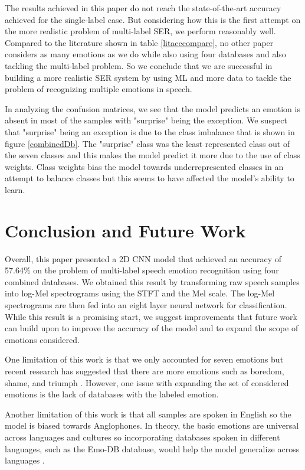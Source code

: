 The results achieved in this paper do not reach the state-of-the-art accuracy achieved for the single-label case. But considering how this is the first attempt on the more realistic problem of multi-label SER, we perform reasonably well. Compared to the literature shown in table \ref{litacccompare}, no other paper considers as many emotions as we do while also using four databases and also tackling the multi-label problem. So we conclude that we are successful in building a more realistic SER system by using ML and more data to tackle the problem of recognizing multiple emotions in speech.

In analyzing the confusion matrices, we see that the model predicts an emotion is absent in most of the samples with "surprise" being the exception. We suspect that "surprise" being an exception is due to the class imbalance that is shown in figure \ref{combinedDb}. The "surprise" class was the least represented class out of the seven classes and this makes the model predict it more due to the use of class weights. Class weights bias the model towards underrepresented classes in an attempt to balance classes but this seems to have affected the model's ability to learn.

\section{Conclusion and Future Work}

Overall, this paper presented a 2D CNN model that achieved an accuracy of 57.64\% on the problem of multi-label speech emotion recognition using four combined databases. We obtained this result by transforming raw speech samples into log-Mel spectrograms using the STFT and the Mel scale. The log-Mel spectrograms are then fed into an eight layer neural network for classification. While this result is a promising start, we suggest improvements that future work can build upon to improve the accuracy of the model and to expand the scope of emotions considered.

One limitation of this work is that we only accounted for seven emotions but recent research has suggested that there are more emotions such as boredom, shame, and triumph \cite{Cordaro2018}. However, one issue with expanding the set of considered emotions is the lack of databases with the labeled emotion.

Another limitation of this work is that all samples are spoken in English so the model is biased towards Anglophones. In theory, the basic emotions are universal across languages and cultures so incorporating databases spoken in different languages, such as the Emo-DB database, would help the model generalize across languages \cite{Burkhardt2005}.

